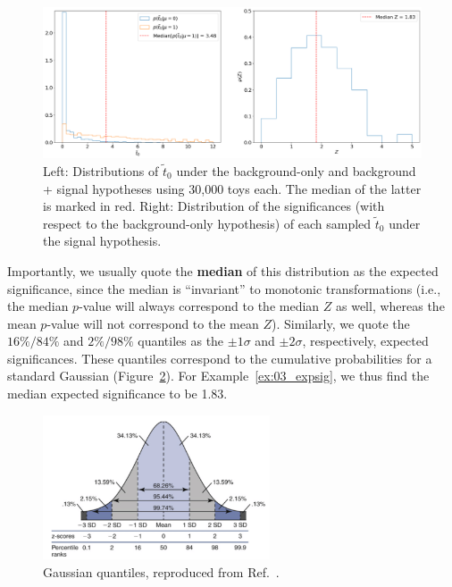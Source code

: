 \begin{figure}[htb]
\centering
\includegraphics[width=\textwidth]{figures/03-Stats/04-expected/1.png}
\caption[Left: Distributions of $\tilde{t}_0$ under the background-only and background + signal hypotheses using 30,000 toys each.]{Left: Distributions of $\tilde{t}_0$ under the background-only and background + signal hypotheses using 30,000 toys each.
The median of the latter is marked in red.
Right: Distribution of the significances (with respect to the background-only hypothesis) of each sampled $\tilde{t}_0$ under the signal hypothesis.
}
\label{fig:03_expZ}
\end{figure}

Importantly, we usually quote the \textbf{median} of this distribution as the expected significance, since the median is ``invariant'' to monotonic transformations (i.e., the median $p$-value will always correspond to the median $Z$ as well, whereas the mean $p$-value will not correspond to the mean $Z$).
Similarly, we quote the $16\%/84\%$ and $2\%/98\%$ quantiles as the $\pm 1\sigma$ and $\pm 2\sigma$, respectively, expected significances.
These quantiles correspond to the cumulative probabilities for a standard Gaussian (Figure~\ref{fig:03_gaussian_quantiles}).
For Example~\ref{ex:03_expsig}, we thus find the median expected significance to be 1.83.

\begin{figure}[htb]
\centering
\includegraphics[width=0.6\textwidth]{figures/03-Stats/04-expected/gaussian_quantiles.png}
\captionsetup{justification=centering}
\caption{Gaussian quantiles, reproduced from Ref.~\cite{Stiller:thesis}.}
\label{fig:03_gaussian_quantiles}
\end{figure}

